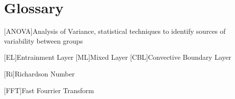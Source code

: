 
\chapter{Glossary}




\begin{acronym}[ANOVA]
[ANOVA]{Analysis of Variance, statistical 
techniques to identify sources of variability between groups}



[EL]{Entrainment Layer}
[ML]{Mixed Layer}
[CBL]{Convective Boundary Layer}

[Ri]{Richardson Number 
}

[FFT]{Fast Fourrier Transform}


\end{acronym}

